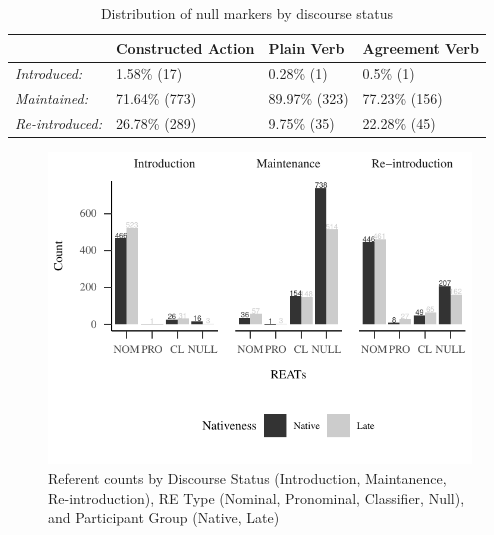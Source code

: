 \documentclass[]{elsarticle} %
\begin{document}
\begin{table}
\small
\caption{Distribution of null markers by discourse status}
\label{tab:my-table5}
\begin{tabular}{llll}
\hline
                        & Constructed Action & Plain Verb    & Agreement Verb \\ \hline
\textit{Introduced:}    & 1.58\% (17)        & 0.28\% (1)    & 0.5\% (1)      \\
\textit{Maintained:}    & 71.64\% (773)      & 89.97\% (323) & 77.23\% (156)  \\
\textit{Re-introduced:} & 26.78\% (289)      & 9.75\% (35)   & 22.28\% (45)   \\ \hline
\end{tabular}
\end{table}

\begin{figure}
\centering
\includegraphics{revised_manuscript_files/figure-latex/fig:count-plot-1.pdf}
\caption{Referent counts by Discourse Status (Introduction, Maintanence,
Re-introduction), RE Type (Nominal, Pronominal, Classifier, Null), and
Participant Group (Native, Late)}
\end{figure}
\end{document}
